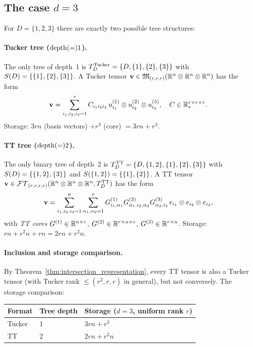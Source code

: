\subsection*{The case $d=3$}

For $D = \{1,2,3\}$ there are exactly two possible tree structures:

\paragraph{Tucker tree ($\mathrm{depth}(=) 1$).}
The only tree of depth~1 is $T_D^{\mathrm{Tucker}} = \{D, \{1\},\{2\},\{3\}\}$
with $S(D) = \{\{1\},\{2\},\{3\}\}$. A Tucker tensor
$\mathbf{v} \in \mathfrak{M}_{(r,r,r)}(\mathbb{R}^n \otimes \mathbb{R}^n \otimes \mathbb{R}^n)$ has the form
\begin{equation*}
    \mathbf{v} = \sum_{i_1,i_2,i_3=1}^r C_{i_1 i_2 i_3}\,
    u^{(1)}_{i_1} \otimes u^{(2)}_{i_2} \otimes u^{(3)}_{i_3},
    \quad C \in \mathbb{R}^{r \times r \times r}_*.
\end{equation*}
Storage: $3rn$ (basis vectors) $+ r^3$ (core) $= 3rn + r^3$.

\paragraph{TT tree ($\mathrm{depth}(=) 2$).}
The only binary tree of depth~2 is $T_D^{\mathrm{TT}} =
\{D, \{1,2\}, \{1\},\{2\},\{3\}\}$ with
$S(D) = \{\{1,2\},\{3\}\}$ and $S(\{1,2\}) = \{\{1\},\{2\}\}$.
A TT tensor $\mathbf{v} \in \mathcal{FT}_{(r,r,r,r)}(\mathbb{R}^n \otimes \mathbb{R}^n \otimes \mathbb{R}^n,T_D^{\mathrm{TT}})$
has the form
\begin{equation*}
    \mathbf{v} = \sum_{i_1,i_2,i_3=1}^{n}
    \sum_{\alpha_1, \alpha_2=1}^{r}
    G^{(1)}_{i_1, \alpha_1} G^{(2)}_{\alpha_1, i_2, \alpha_2}
    G^{(3)}_{\alpha_2, i_3}\,
    e_{i_1} \otimes e_{i_2} \otimes e_{i_3},
\end{equation*}
with \emph{TT cores} $G^{(1)} \in \mathbb{R}^{n \times r}$,
$G^{(2)} \in \mathbb{R}^{r \times n \times r}$,
$G^{(3)} \in \mathbb{R}^{r \times n}$.
Storage: $rn + r^2 n + rn = 2rn + r^2 n$.

\paragraph{Inclusion and storage comparison.}
By Theorem~\ref{thm:intersection_representation}, every TT tensor is
also a Tucker tensor (with Tucker rank $\leq (r^2, r, r)$ in general),
but not conversely. The storage comparison:

\begin{center}
\renewcommand{\arraystretch}{1.3}
\begin{tabular}{@{}lll@{}}
\toprule
Format & Tree depth & Storage ($d=3$, uniform rank $r$) \\
\midrule
Tucker & 1 & $3rn + r^3$ \\
TT & 2 & $2rn + r^2 n$ \\
\bottomrule
\end{tabular}
\end{center}

